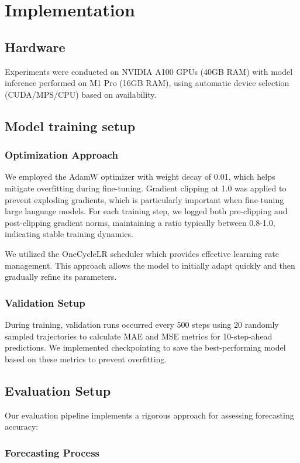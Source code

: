 \documentclass{article}
\begin{document}
\section*{Implementation}

\subsection*{Hardware}
Experiments were conducted on NVIDIA A100 GPUs (40GB RAM) with model inference performed on M1 Pro (16GB RAM), using automatic device selection (CUDA/MPS/CPU) based on availability.
\subsection*{Model training setup}
\subsubsection*{Optimization Approach}

We employed the AdamW optimizer with weight decay of 0.01, which helps mitigate overfitting during fine-tuning. Gradient clipping at 1.0 was applied to prevent exploding gradients, which is particularly important when fine-tuning large language models. For each training step, we logged both pre-clipping and post-clipping gradient norms, maintaining a ratio typically between 0.8-1.0, indicating stable training dynamics.

We utilized the OneCycleLR scheduler which provides effective learning rate management. This approach allows the model to initially adapt quickly and then gradually refine its parameters.

\subsubsection*{Validation Setup}
During training, validation runs occurred every 500 steps using 20 randomly sampled trajectories to calculate MAE and MSE metrics for 10-step-ahead predictions. We implemented checkpointing to save the best-performing model based on these metrics to prevent overfitting.

\subsection*{Evaluation Setup}
Our evaluation pipeline implements a rigorous approach for assessing forecasting accuracy:
\subsubsection*{Forecasting Process}
\end{document}
